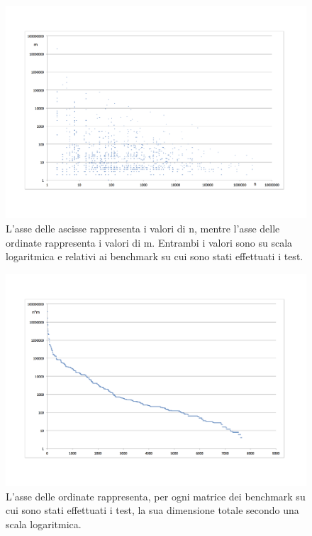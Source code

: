 \documentclass[a4paper]{article}   %
\begin{document}
\begin{figure}[!h]
\includegraphics[scale=0.44]{graficoNM.png}
\caption{L'asse delle ascisse rappresenta i valori di n, mentre l'asse delle ordinate rappresenta i valori di m. Entrambi i valori sono su scala logaritmica e relativi ai benchmark su cui sono stati effettuati i test.}
\label{graficoNM}
\end{figure}

 \begin{figure}[!h]
\includegraphics[scale=0.44]{sommavaloretotale.png}
\caption{L'asse delle ordinate rappresenta, per ogni matrice dei benchmark su cui sono stati effettuati i test, la sua dimensione totale secondo una scala logaritmica.}
\label{sommavaloretotale}
\end{figure}
\end{document}
